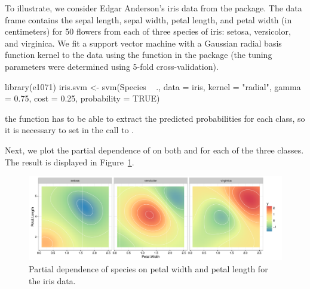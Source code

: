To illustrate, we consider Edgar Anderson's iris data from the  package. The  data frame contains the sepal length, sepal width, petal length, and petal width (in centimeters) for 50 flowers from each of three species of iris:  setosa, versicolor, and virginica. We fit a support vector machine with a Gaussian radial basis function kernel to the data using the  function in the  package (the tuning parameters were determined using 5-fold cross-validation).
\begin{example}
library(e1071)
iris.svm <- svm(Species ~ ., data = iris, kernel = "radial", gamma = 0.75,
                cost = 0.25, probability = TRUE)
\end{example}
 the  function has to be able to extract the predicted probabilities for each class, so it is necessary to set  in the call to .

Next, we plot the partial dependence of  on both  and  for each of the three classes. The result is displayed in Figure~\ref{fig:partial_iris}. %

\begin{figure}[!htbp]
  \centering
  \includegraphics[width=1.0\linewidth]{partial_iris_svm}
  \caption{Partial dependence of species on petal width and petal length for the iris data.}
  \label{fig:partial_iris}
\end{figure}


